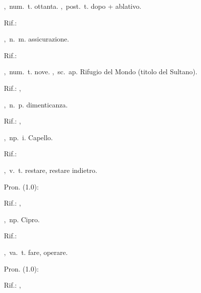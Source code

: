 ,\ num.\ t.
ottanta.
,\ post.\ t.
dopo + ablativo.
\begin{subvocedue}
\item[Rif.:] 
\end{subvocedue}
,\ n.\ m.
assicurazione.
\begin{subvocedue}
\item[Rif.:] 
\end{subvocedue}
,\ num.\ t.
nove.
,\ sc.\ ap.
Rifugio del Mondo (titolo del Sultano).
\begin{subvocedue}
\item[Rif.:] , 
\end{subvocedue}
,\ n.\ p.
dimenticanza.
\begin{subvocedue}
\item[Rif.:] , 
\end{subvocedue}
,\ np.\ i.
Capello.
\begin{subvocedue}
\item[Rif.:] 
\end{subvocedue}
,\ v.\ t.
restare, restare indietro.
\begin{subvocedue}
\item[Pron. (1.0):] 
\item[Rif.:] , 
\end{subvocedue}
,\ np.
Cipro.
\begin{subvocedue}
\item[Rif.:] 
\end{subvocedue}
,\ va.\ t.
fare, operare.
\begin{subvocedue}
\item[Pron. (1.0):] 
\item[Rif.:] , 
\end{subvocedue}
